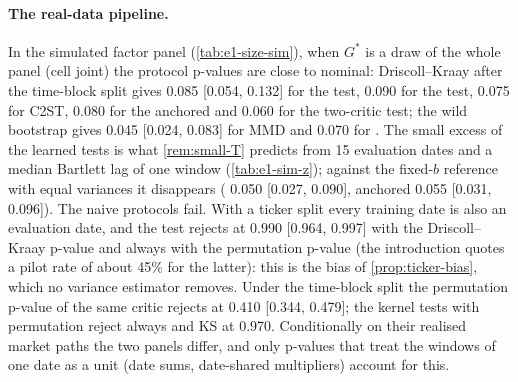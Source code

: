 \begin{table}[tbp]
  \centering
  \caption{Size of the real-data pipeline in the simulated factor panel (E1(a)): rejection rates
    under $H_0$ at $\alpha=0.05$ with Wilson 95\% intervals, 200 replications per cell, 100
    tickers, $L=20$, 3000 real and 3000 synthetic \TEST{} windows, 6200 past windows (relative
    tests). $G^*$ joint: independent draw of the whole factor panel; indep.: tickers drawn
    independently with the same marginal laws.}
  \label{tab:e1-size-sim}
  \small
\end{table}

\paragraph{The real-data pipeline.}
In the simulated factor panel (\cref{tab:e1-size-sim}), when $G^*$ is a draw of the whole panel
(cell joint) the protocol p-values are close to nominal: Driscoll--Kraay after the time-block split
gives 0.085 [0.054, 0.132] for the \WC{} test, 0.090 for the \LRC{} test, 0.075 for C2ST, 0.080 for
the anchored and 0.060 for the two-critic test; the wild bootstrap gives 0.045 [0.024, 0.083] for
MMD and 0.070 for \SigMMD{}. The small excess of the learned tests is what \cref{rem:small-T}
predicts from 15 evaluation dates and a median Bartlett lag of one window (\cref{tab:e1-sim-z});
against the fixed-$b$ reference with equal variances it disappears (\WC{} 0.050 [0.027, 0.090],
anchored 0.055 [0.031, 0.096]). The naive protocols fail. With a ticker split every training date
is also an evaluation date, and the \WC{} test rejects at 0.990 [0.964, 0.997] with the
Driscoll--Kraay p-value and always with the permutation p-value (the introduction quotes a pilot rate
of about 45\% for the latter): this is the bias of \cref{prop:ticker-bias}, which no variance
estimator removes. Under the time-block split the permutation p-value of the same critic rejects at
0.410 [0.344, 0.479]; the kernel tests with \iid{} permutation reject always and KS at 0.970.
Conditionally on their realised market paths the two panels differ, and only p-values that treat
the windows of one date as a unit (date sums, date-shared multipliers) account for this.

